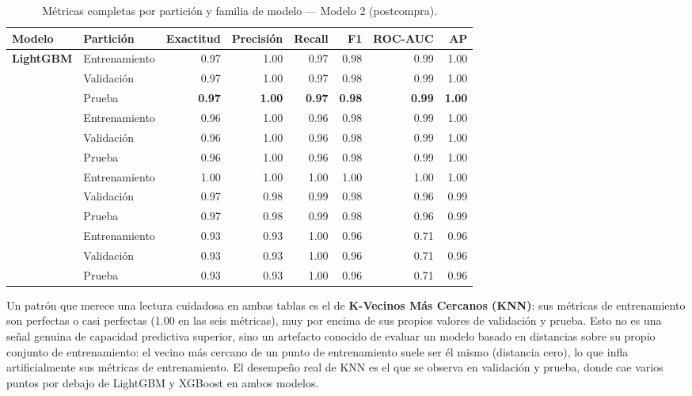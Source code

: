 \documentclass[11pt,letterpaper]{article}
\begin{document}
\begin{table}[h!]
\centering
\footnotesize
\caption{Métricas completas por partición y familia de modelo --- Modelo 2 (postcompra).}
\label{tab:full_m2}
\begin{tabular}{@{}llrrrrrr@{}}
\toprule
Modelo & Partición & Exactitud & Precisión & Recall & F1 & ROC-AUC & AP \\
\midrule
\multirow{3}{*}{\textbf{LightGBM}}
  & Entrenamiento & 0.97 & 1.00 & 0.97 & 0.98 & 0.99 & 1.00 \\
  & Validación    & 0.97 & 1.00 & 0.97 & 0.98 & 0.99 & 1.00 \\
  & Prueba        & \textbf{0.97} & \textbf{1.00} & \textbf{0.97} & \textbf{0.98} & \textbf{0.99} & \textbf{1.00} \\
\addlinespace
\multirow{3}{*}{XGBoost}
  & Entrenamiento & 0.96 & 1.00 & 0.96 & 0.98 & 0.99 & 1.00 \\
  & Validación    & 0.96 & 1.00 & 0.96 & 0.98 & 0.99 & 1.00 \\
  & Prueba        & 0.96 & 1.00 & 0.96 & 0.98 & 0.99 & 1.00 \\
\addlinespace
\multirow{3}{*}{KNN}
  & Entrenamiento & 1.00 & 1.00 & 1.00 & 1.00 & 1.00 & 1.00 \\
  & Validación    & 0.97 & 0.98 & 0.99 & 0.98 & 0.96 & 0.99 \\
  & Prueba        & 0.97 & 0.98 & 0.99 & 0.98 & 0.96 & 0.99 \\
\addlinespace
\multirow{3}{*}{LDA}
  & Entrenamiento & 0.93 & 0.93 & 1.00 & 0.96 & 0.71 & 0.96 \\
  & Validación    & 0.93 & 0.93 & 1.00 & 0.96 & 0.71 & 0.96 \\
  & Prueba        & 0.93 & 0.93 & 1.00 & 0.96 & 0.71 & 0.96 \\
\bottomrule
\end{tabular}
\end{table}

Un patrón que merece una lectura cuidadosa en ambas tablas es el de \textbf{K-Vecinos Más Cercanos (KNN)}: sus métricas de entrenamiento son perfectas o casi perfectas (1.00 en las seis métricas), muy por encima de sus propios valores de validación y prueba. Esto no es una señal genuina de capacidad predictiva superior, sino un artefacto conocido de evaluar un modelo basado en distancias sobre su propio conjunto de entrenamiento: el vecino más cercano de un punto de entrenamiento suele ser él mismo (distancia cero), lo que infla artificialmente sus métricas de entrenamiento. El desempeño real de KNN es el que se observa en validación y prueba, donde cae varios puntos por debajo de LightGBM y XGBoost en ambos modelos.
\end{document}
